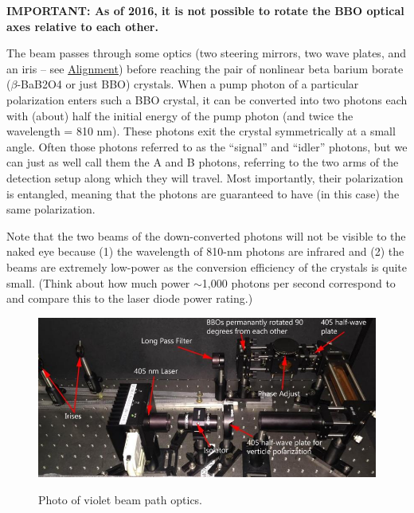\documentclass{../lab}
\begin{document}
\textbf{IMPORTANT: As of 2016, it is not possible to rotate the BBO optical axes relative to each other.}

The beam passes through some optics (two steering mirrors, two wave plates, and an iris -- see \hyperref[sec:Alignment]{Alignment}) before reaching the pair of nonlinear beta barium borate ($\beta$-BaB2O4 or just BBO) crystals. When a pump photon of a particular polarization enters such a BBO crystal, it can be converted into two photons each with (about) half the initial energy of the pump photon (and twice the wavelength = 810 nm). These photons exit the crystal symmetrically at a small angle. Often those photons referred to as the ``signal'' and ``idler'' photons, but we can just as well call them the A and B photons, referring to the two arms of the detection setup along which they will travel. Most importantly, their polarization is entangled, meaning that the photons are guaranteed to have (in this case) the same polarization.

Note that the two beams of the down-converted photons will not be visible to the naked eye because (1) the wavelength of 810-nm photons are infrared and (2) the beams are extremely low-power as the conversion efficiency of the crystals is quite small. (Think about how much power $\sim$1,000 photons per second correspond to and compare this to the laser diode power rating.)

\begin{figure}[h]
    \centering
    \href{http://experimentationlab.berkeley.edu/sites/default/files/qie_optics_image_0.jpg}{\includegraphics[width=0.7\linewidth]{images/qie_optics_image_0.jpg}}
    \caption{Photo of violet beam path optics.}
    \label{fig:qie_optics_image_0}
\end{figure}
\end{document}
